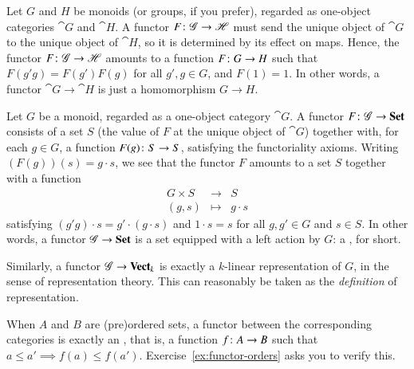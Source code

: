 \begin{example}
\label{eg:ftrs-between-monoids}
Let $G$ and $H$ be monoids (or groups, if you prefer), regarded as
one-object%
%
%
categories $\cat{G}$ and $\cat{H}$.  A functor $F\from \cat{G} \to \cat{H}$
must send the unique object of $\cat{G}$ to the unique object of $\cat{H}$,
so it is determined by its effect on maps.  Hence, the functor $F \from
\cat{G} \to \cat{H}$ amounts to a function $F\from G \to H$ such that $F(g'
g) = F(g') F(g)$ for all $g', g \in G$, and $F(1) = 1$.  In other words, a
functor $\cat{G} \to \cat{H}$ is just a homomorphism $G \to H$.
\end{example}

\begin{example}
\label{eg:functor-action}
Let $G$ be a monoid,%
%
%
regarded as a one-object category $\cat{G}$.  A functor $F\from \cat{G} \to
\Set$ consists of a set $S$ (the value of $F$ at the unique object of
$\cat{G}$) together with, for each $g \in G$, a function $F(g)\from S \to
S$, satisfying the functoriality axioms.  Writing $(F(g))(s) = g \cdot s$,
we see that the functor $F$ amounts to a set $S$ together with a function
\[
\begin{array}{ccc}
G \times S      &\to            &S      \\
(g, s)          &\mapsto        &g \cdot s
\end{array}
\]
satisfying $(g' g) \cdot s = g' \cdot (g \cdot s)$ and $1 \cdot s = s$ for
all $g, g' \in G$ and $s \in S$.  In other words, a functor $\mathscr{G} \to
\mathbf{Set}$ is a set equipped with a left action by $G$: a ,%
%
%
for short.

Similarly, a functor $\mathscr{G} \to \mathbf{Vect}_k$ is exactly a $k$-linear
representation%
%
%
of $G$, in the sense of representation theory.  This can reasonably be
taken as the \emph{definition} of representation.
\end{example}

\begin{example}
\label{eg:functor-orders}
When $A$ and $B$ are (pre)ordered sets, a functor between the corresponding
categories is exactly an , that is, a function
$f\from A \to B$ such that $a \leq a' \implies f(a) \leq f(a')$.
Exercise~\ref{ex:functor-orders} asks you to verify this.
\end{example}

